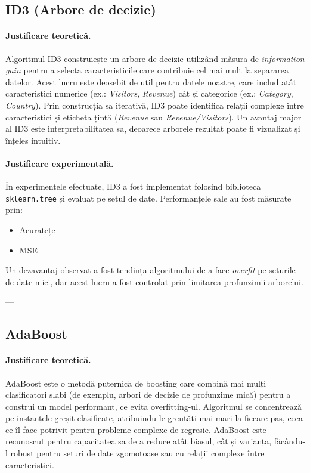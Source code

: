 \documentclass{article}
\begin{document}
\subsection*{ID3 (Arbore de decizie)}

\paragraph{Justificare teoretică.}  
Algoritmul ID3 construiește un arbore de decizie utilizând măsura de \textit{information gain} pentru a selecta caracteristicile care contribuie cel mai mult la separarea datelor. Acest lucru este deosebit de util pentru datele noastre, care includ atât caracteristici numerice (ex.: \textit{Visitors}, \textit{Revenue}) cât și categorice (ex.: \textit{Category}, \textit{Country}). Prin construcția sa iterativă, ID3 poate identifica relații complexe între caracteristici și eticheta țintă (\textit{Revenue} sau \textit{Revenue/Visitors}). Un avantaj major al ID3 este interpretabilitatea sa, deoarece arborele rezultat poate fi vizualizat și înțeles intuitiv.

\paragraph{Justificare experimentală.}  
În experimentele efectuate, ID3 a fost implementat folosind biblioteca \texttt{sklearn.tree} și evaluat pe setul de date. Performanțele sale au fost măsurate prin:
\begin{itemize}
    \item  Acuratețe
    \item  MSE
\end{itemize}

Un dezavantaj observat a fost tendința algoritmului de a face \textit{overfit} pe seturile de date mici, dar acest lucru a fost controlat prin limitarea profunzimii arborelui.

---

\subsection*{AdaBoost}

\paragraph{Justificare teoretică.}  
AdaBoost este o metodă puternică de boosting care combină mai mulți clasificatori slabi (de exemplu, arbori de decizie de profunzime mică) pentru a construi un model performant, ce evita overfitting-ul. Algoritmul se concentrează pe instanțele greșit clasificate, atribuindu-le greutăți mai mari la fiecare pas, ceea ce îl face potrivit pentru probleme complexe de regresie. AdaBoost este recunoscut pentru capacitatea sa de a reduce atât biasul, cât și varianța, făcându-l robust pentru seturi de date zgomotoase sau cu relații complexe între caracteristici.
\end{document}
